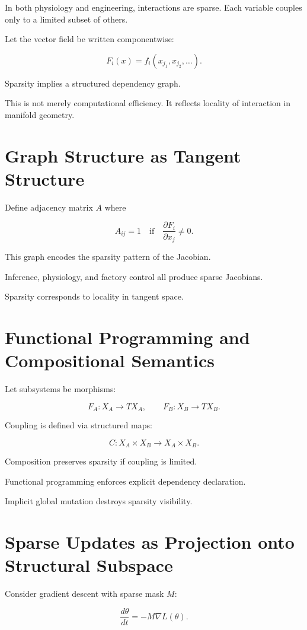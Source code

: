 \documentclass[12pt]{book}
\begin{document}
In both physiology and engineering, interactions are sparse. Each variable couples only to a limited subset of others.

Let the vector field be written componentwise:

\[
F_i(x) = f_i(x_{j_1}, x_{j_2}, \dots).
\]

Sparsity implies a structured dependency graph.

This is not merely computational efficiency. It reflects locality of interaction in manifold geometry.

\section{Graph Structure as Tangent Structure}

Define adjacency matrix $A$ where

\[
A_{ij} = 1
\quad \text{if} \quad
\frac{\partial F_i}{\partial x_j} \neq 0.
\]

This graph encodes the sparsity pattern of the Jacobian.

Inference, physiology, and factory control all produce sparse Jacobians.

Sparsity corresponds to locality in tangent space.

\section{Functional Programming and Compositional Semantics}

Let subsystems be morphisms:

\[
F_A : X_A \to TX_A,
\qquad
F_B : X_B \to TX_B.
\]

Coupling is defined via structured maps:

\[
C : X_A \times X_B \to X_A \times X_B.
\]

Composition preserves sparsity if coupling is limited.

Functional programming enforces explicit dependency declaration.

Implicit global mutation destroys sparsity visibility.

\section{Sparse Updates as Projection onto Structural Subspace}

Consider gradient descent with sparse mask $M$:

\[
\frac{d\theta}{dt} = - M \nabla L(\theta).
\]
\end{document}
